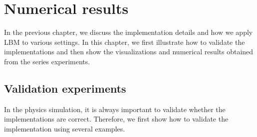\chapter{Numerical results}
\vspace{-8mm}
In the previous chapter, we discuss the implementation details
and how we apply LBM to various settings.
In this chapter, we first illustrate
how to validate the implementations and 
then show the visualizations and numerical results
obtained from the series experiments.

\section{Validation experiments}
In the physics simulation, it is always important
to validate whether the implementations are correct.
Therefore, we first show how to validate the implementation
using several examples.

